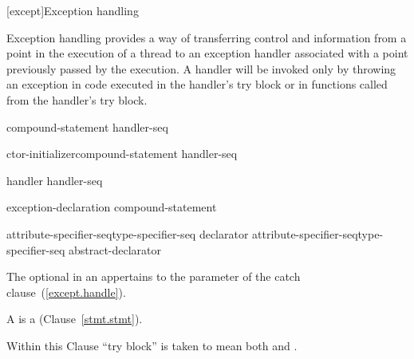 [except]{Exception handling}%


%

\pnum
Exception handling provides a way of transferring control and information
from a point in the execution of a thread to an exception handler
associated with a point previously passed by the execution.
A handler will be invoked only by throwing an exception
in code executed in the handler's try block
or in functions called from the handler's try block.

%
%
\begin{bnf}
\br
     compound-statement handler-seq
\end{bnf}

%
%
\begin{bnf}
\br
     ctor-initializer\opt compound-statement handler-seq
\end{bnf}

\begin{bnf}
\br
    handler handler-seq\opt
\end{bnf}

%
%
\begin{bnf}
\br
     exception-declaration \terminal{)} compound-statement
\end{bnf}

\begin{bnf}
\br
    attribute-specifier-seq\opt type-specifier-seq declarator\br
    attribute-specifier-seq\opt type-specifier-seq abstract-declarator\opt\br
\end{bnf}

The optional  in an 
appertains to the parameter of the catch clause~(\ref{except.handle}).

\pnum
{}%
%
%
%
A  is a  (Clause~\ref{stmt.stmt}).
\begin{note} Within this Clause
``try block'' is taken to mean both  and
. \end{note}

